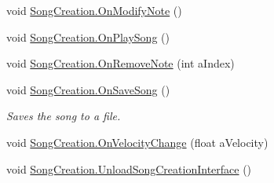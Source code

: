 \begin{DoxyCompactItemize}
void \hyperlink{group___s_c_handlers_gadcf6d627fa8dc06d04c27512ce59dd85}{Song\+Creation.\+On\+Modify\+Note} ()
\item 
void \hyperlink{group___s_c_handlers_gab333656dbc41fbebb320a30c48501370}{Song\+Creation.\+On\+Play\+Song} ()
\item 
void \hyperlink{group___s_c_handlers_ga485d615c895cddde720b719b64ab4245}{Song\+Creation.\+On\+Remove\+Note} (int a\+Index)
\item 
void \hyperlink{group___s_c_handlers_ga3fac289dfb9e67d94afbeb0dfdb22f48}{Song\+Creation.\+On\+Save\+Song} ()
\begin{DoxyCompactList}\small\item\em Saves the song to a file. \end{DoxyCompactList}\item 
void \hyperlink{group___s_c_handlers_ga929912496540563f4ec02295a0d333c6}{Song\+Creation.\+On\+Velocity\+Change} (float a\+Velocity)
\item 
void \hyperlink{group___s_c_handlers_gae631852736624d333cc26e1ae9d14871}{Song\+Creation.\+Unload\+Song\+Creation\+Interface} ()
\end{DoxyCompactItemize}
